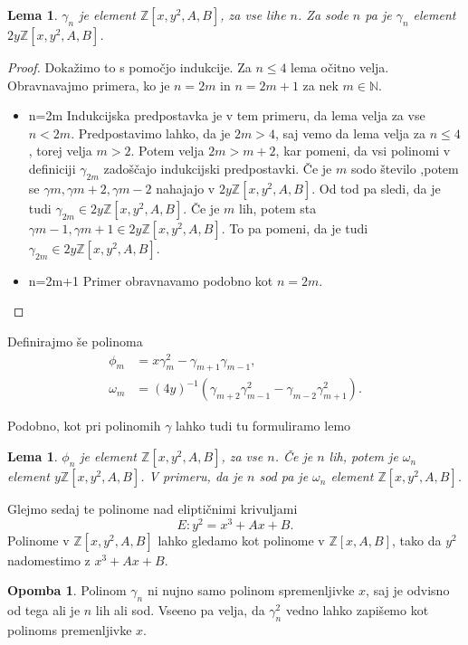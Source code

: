 \documentclass[12pt,a4paper,twoside]{article}
\theoremstyle{definition} %
\newtheorem{opomba}[definicija]{Opomba}
\theoremstyle{plain} %
\newtheorem{lema}[definicija]{Lema}
\numberwithin{equation}{section}  %
\newcommand{\N}{\mathbb N}
\newcommand{\Z}{\mathbb Z}
\begin{document}
\begin{lema}

$\gamma_{n}$ je element $\Z[x,y^2,A,B]$, za vse lihe $n$.  Za sode $n$ pa je $\gamma_{n}$ element $2y\Z[x,y^2,A,B]$.

\end{lema}

\begin{proof}
Dokažimo to s pomočjo indukcije. Za $n \leq 4$ lema očitno velja. Obravnavajmo primera, ko je $n=2m$ in  $n=2m+1$ za nek $m\in\N$.
\begin{itemize}
\item{n=2m}
Indukcijska predpostavka je v tem primeru, da lema velja za vse $n<2m$.
Predpostavimo lahko, da je $2m>4$, saj vemo da lema velja za $n\leq 4$, torej velja $m>2$. Potem velja $2m>m+2$, kar pomeni, da vsi polinomi v definiciji $\gamma_{2m}$ zadoščajo indukcijski predpostavki. Če je $m$ sodo število ,potem se $\gamma{m},\gamma{m+2},\gamma{m-2}$ nahajajo v $2y\Z[x,y^2,A,B]$. Od tod pa sledi, da je tudi $\gamma_{2m} \in 2y\Z[x,y^2,A,B]$.
Če je $m$ lih, potem sta $\gamma{m-1},\gamma{m+1} \in 2y\Z[x,y^2,A,B]$. To pa pomeni, da je tudi  $\gamma_{2m} \in 2y\Z[x,y^2,A,B]$.
\item{n=2m+1}
Primer obravnavamo podobno kot $n=2m$.


\end{itemize}


\end{proof}

Definirajmo še polinoma
\begin{align}
\phi_m &{}=x\gamma^2_m-\gamma_{m+1}\gamma_{m-1}, \nonumber \\
\omega_m &{} = (4y)^{-1}(\gamma_{m+2}\gamma^2_{m-1}-\gamma_{m-2}\gamma^2_{m+1}). \nonumber
\end{align}

Podobno, kot pri polinomih $\gamma$ lahko tudi tu formuliramo lemo

\begin{lema}

$\phi_{n}$ je element $\Z[x,y^2,A,B]$, za vse $n$. Če je $n$ lih, potem je $\omega_{n}$ element $y\Z[x,y^2,A,B]$. V primeru, da je $n$ sod pa je $\omega_{n}$ element $\Z[x,y^2,A,B]$.

\end{lema}

Glejmo sedaj te polinome nad eliptičnimi krivuljami
$$E: y^2=x^3+Ax+B.$$
Polinome v $\Z[x,y^2,A,B]$ lahko gledamo kot polinome v $\Z[x,A,B]$, tako da $y^2$ nadomestimo z $x^3+Ax+B$.
\begin{opomba}
Polinom $\gamma_n$ ni nujno samo polinom spremenljivke $x$, saj je odvisno od tega ali je $n$ lih ali sod. Vseeno pa velja, da  $\gamma^2_n$ vedno lahko zapišemo kot polinoms premenljivke $x$.

\end{opomba}
\end{document}
